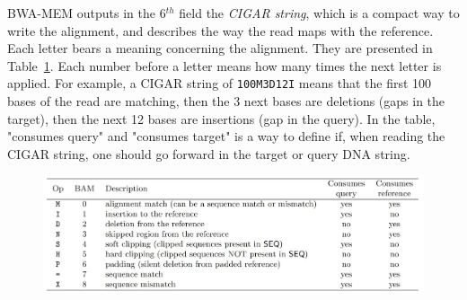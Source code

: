 BWA-MEM outputs in the 6$^{th}$ field the \emph{CIGAR string}, which is a compact way to write the alignment, and describes the way the read maps with the reference. Each letter bears a meaning concerning the alignment. They are presented in Table~\ref{tab:cigar}. Each number before a letter means how many times the next letter is applied. For example, a CIGAR string of \verb|100M3D12I| means that the first 100 bases of the read are matching, then the 3 next bases are deletions (gaps in the target), then the next 12 bases are insertions (gap in the query). In the table, "consumes query" and "consumes target" is a way to define if, when reading the CIGAR string, one should go forward in the target or query DNA string.

\begin{figure}[h!]
    \centering
    \includegraphics[width=1\linewidth]{cigarguide}
    \label{tab:cigar}
\end{figure}{}


